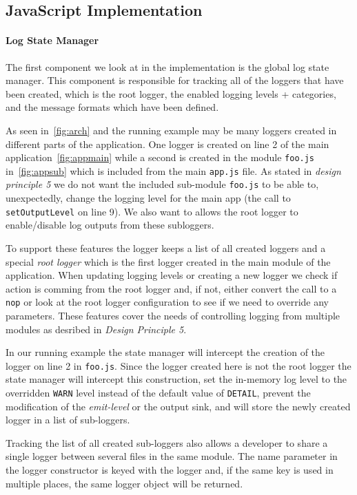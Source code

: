 \subsection{JavaScript Implementation}
\paragraph{Log State Manager}
\noindent
The first component we look at in the implementation is the global log state 
manager. This component is responsible for tracking all of the loggers that 
have been created, which is the root logger, the enabled logging levels + 
categories, and the message formats which have been defined. 

As seen in~\autoref{fig:arch} and the running example may be many loggers 
created in different parts of the application. One logger is created on line 
2 of the main application~\autoref{fig:appmain} while a second is created 
in the module \texttt{foo.js} in~\autoref{fig:appsub} which is included from 
the main \texttt{app.js} file. As stated in \emph{design principle 5} we 
do not want the included sub-module \texttt{foo.js} to be able to, unexpectedly, 
change the logging level for the main app (the call to \texttt{setOutputLevel} on 
line 9). We also want to allows the root logger to enable/disable log outputs 
from these subloggers. 

To support these features the \projn logger keeps a list of all created loggers 
and a special \emph{root logger} which is the first logger created in the main 
module of the application. When updating logging levels or creating a new logger 
we check if action is comming from the root logger and, if not, either convert 
the call to a \texttt{nop} or look at the root logger configuration to see if 
we need to override any parameters. These features cover the needs of controlling 
logging from multiple modules as desribed in \emph{Design Principle 5}.

In our running example the state manager will intercept the creation of the logger 
on line 2 in \texttt{foo.js}. Since the logger created here is not the root logger
the state manager will intercept this construction, set the in-memory log level to 
the overridden \texttt{WARN} level instead of the default value of \texttt{DETAIL}, 
prevent the modification of the \emph{emit-level} or the output sink, and will 
store the newly created logger in a list of sub-loggers. 

Tracking the list of all created sub-loggers also allows a developer to share a 
single logger between several files in the same module. The name parameter in the 
logger constructor is keyed with the logger and, if the same key is used in multiple 
places, the same logger object will be returned.


